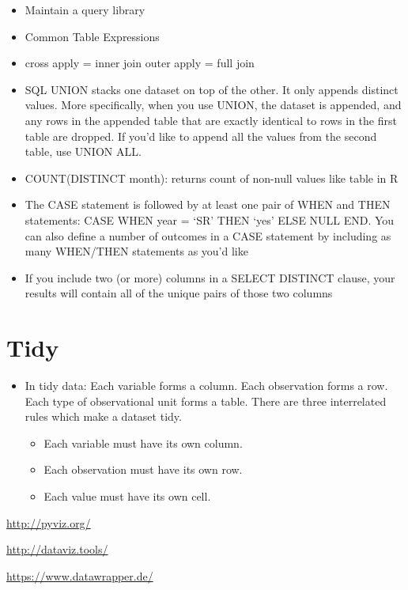 \documentclass[]{book}
\providecommand{\tightlist}{%
  \setlength{\itemsep}{0pt}\setlength{\parskip}{0pt}}
\begin{document}
\begin{itemize}
\item
  Maintain a query library
\item
  Common Table Expressions
\item
  cross apply = inner join \textbar{} outer apply = full join
\item
  SQL UNION stacks one dataset on top of the other. It only appends distinct values. More specifically, when you use UNION, the dataset is appended, and any rows in the appended table that are exactly identical to rows in the first table are dropped. If you'd like to append all the values from the second table, use UNION ALL.
\item
  COUNT(DISTINCT month): returns count of non-null values like table in R
\item
  The CASE statement is followed by at least one pair of WHEN and THEN statements: CASE WHEN year = `SR' THEN `yes' ELSE NULL END. You can also define a number of outcomes in a CASE statement by including as many WHEN/THEN statements as you'd like
\item
  If you include two (or more) columns in a SELECT DISTINCT clause, your results will contain all of the unique pairs of those two columns
\end{itemize}

\hypertarget{tidy}{%
\section{Tidy}\label{tidy}}

\begin{itemize}
\item
  In tidy data: Each variable forms a column. Each observation forms a row. Each type of observational unit forms a table. There are three interrelated rules which make a dataset tidy.

  \begin{itemize}
  \tightlist
  \item
    Each variable must have its own column.
  \item
    Each observation must have its own row.
  \item
    Each value must have its own cell.
  \end{itemize}
\end{itemize}

\url{http://pyviz.org/}

\url{http://dataviz.tools/}

\url{https://www.datawrapper.de/}
\end{document}
